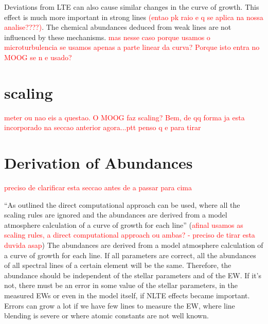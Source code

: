 \documentclass[dvips,12pt,a4paper]{report}
\begin{document}
{%

Deviations from LTE can also cause similar changes in the curve of growth. This effect is much more important in strong lines \textcolor{red}{(entao pk raio e q se aplica na nossa analise????)}. The chemical abundances deduced from weak lines are not influenced by these mechanisms.
\textcolor{red}{mas nesse caso porque usamos o microturbulencia se usamos apenas a parte linear da curva? Porque isto entra no MOOG se n e usado?}


\section{scaling} 

\textcolor{red}{meter ou nao eis a questao. O MOOG faz scaling? Bem, de qq forma ja esta incorporado na seccao anterior agora...ptt penso q e para tirar}




\section{Derivation of Abundances} 
\textcolor{red}{preciso de clarificar esta seccao antes de a passar para cima}

``As outlined the direct computational approach can be used, where all the scaling rules are ignored and the abundances are derived from a model atmosphere calculation of a curve of growth for each line'' (\textcolor{red}{afinal usamos as scaling rules, a direct computational approach ou ambas? - preciso de tirar esta duvida asap})
The abundances are derived from a model atmosphere calculation of a curve of growth for each line. If all parameters are correct, all the abundances of all spectral lines of a certain element will be the same. Therefore, the abundance should be independent of the stellar parameters and of the EW. If it's not, there must be an error in some value of the stellar parameters, in the measured EWs or even in the model itself, if NLTE effects became important. Errors can grow a lot if we have few lines to measure the EW, where line blending is severe or where atomic constants are not well known.

}
\end{document}
